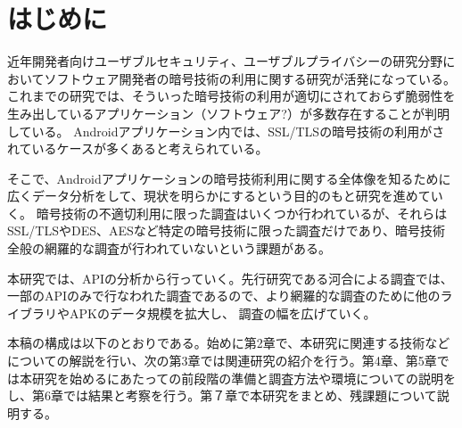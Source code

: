 \newpage
\section{はじめに} 
近年開発者向けユーザブルセキュリティ、ユーザブルプライバシーの研究分野においてソフトウェア開発者の暗号技術の利用に関する研究が活発になっている。
これまでの研究では、そういった暗号技術の利用が適切にされておらず脆弱性を生み出しているアプリケーション（ソフトウェア?）が多数存在することが判明している。
Androidアプリケーション内では、SSL/TLSの暗号技術の利用がされているケースが多くあると考えられている。

そこで、Androidアプリケーションの暗号技術利用に関する全体像を知るために広くデータ分析をして、現状を明らかにするという目的のもと研究を進めていく。
暗号技術の不適切利用に限った調査はいくつか行われているが、それらはSSL/TLSやDES、AESなど特定の暗号技術に限った調査だけであり、暗号技術全般の網羅的な調査が行われていないという課題がある。

本研究では、APIの分析から行っていく。先行研究である河合による調査では、一部のAPIのみで行なわれた調査であるので、より網羅的な調査のために他のライブラリやAPKのデータ規模を拡大し、
調査の幅を広げていく。

本稿の構成は以下のとおりである。始めに第2章で、本研究に関連する技術などについての解説を行い、次の第3章では関連研究の紹介を行う。第4章、第5章では本研究を始めるにあたっての前段階の準備と調査方法や環境についての説明をし、第6章では結果と考察を行う。第７章で本研究をまとめ、残課題について説明する。